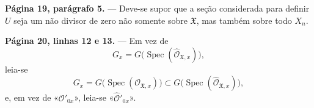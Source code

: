 \noindent\textbf{Página 19, parágrafo 5.} --- Deve-se supor que a seção
considerada para definir $U$ seja um não divisor de zero não somente sobre
$\mathfrak X$, mas também sobre todo $X_n$.

\noindent\textbf{Página 20, linhas 12 e 13.} --- Em vez de
\[
  G_x=G\bigl(\operatorname{Spec}(\widehat{\mathcal O}_{\mathfrak X,x})\bigr),
\]
leia-se
\[
  G_x=G\bigl(\operatorname{Spec}(\mathcal O_{\mathfrak X,x})\bigr)
  \subset
  G\bigl(\operatorname{Spec}(\widehat{\mathcal O}_{\mathfrak X,x})\bigr),
\]
e, em vez de «$\mathcal O'_{0x}$», leia-se
«$\widehat{\mathcal O}'_{0x}$».
